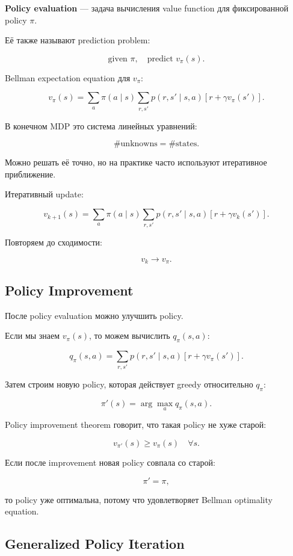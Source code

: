 \documentclass[a4paper,12pt]{article}
\begin{document}
\textbf{Policy evaluation} --- задача вычисления value function для фиксированной policy \(\pi\).

Её также называют prediction problem:

\[
\text{given } \pi, \quad \text{predict } v_\pi(s).
\]

Bellman expectation equation для \(v_\pi\):

\[
v_\pi(s)
=
\sum_a
\pi(a\mid s)
\sum_{r,s'}
p(r,s'\mid s,a)
\left[
r + \gamma v_\pi(s')
\right].
\]

В конечном MDP это система линейных уравнений:

\[
\#\text{unknowns} = \#\text{states}.
\]

Можно решать её точно, но на практике часто используют итеративное приближение.

Итеративный update:

\[
v_{k+1}(s)
=
\sum_a
\pi(a\mid s)
\sum_{r,s'}
p(r,s'\mid s,a)
\left[
r + \gamma v_k(s')
\right].
\]

Повторяем до сходимости:

\[
v_k \rightarrow v_\pi.
\]

\subsection{Policy Improvement}

После policy evaluation можно улучшить policy.

Если мы знаем \(v_\pi(s)\), то можем вычислить \(q_\pi(s,a)\):

\[
q_\pi(s,a)
=
\sum_{r,s'}
p(r,s'\mid s,a)
\left[
r + \gamma v_\pi(s')
\right].
\]

Затем строим новую policy, которая действует greedy относительно \(q_\pi\):

\[
\pi'(s)
=
\arg\max_a q_\pi(s,a).
\]

Policy improvement theorem говорит, что такая policy не хуже старой:

\[
v_{\pi'}(s) \geq v_\pi(s)
\quad \forall s.
\]

Если после improvement новая policy совпала со старой:

\[
\pi' = \pi,
\]

то policy уже оптимальна, потому что удовлетворяет Bellman optimality equation.

\subsection{Generalized Policy Iteration}
\end{document}
